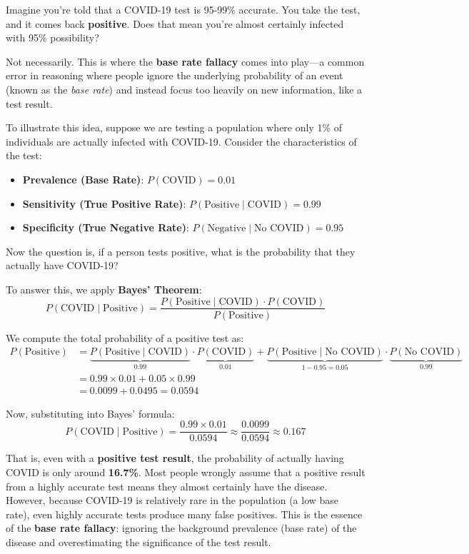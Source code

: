 \documentclass[twoside]{book}
\begin{document}
\medskip

Imagine you're told that a COVID-19 test is 95-99\% accurate. You take the test, and it comes back \textbf{positive}. Does that mean you're almost certainly infected with 95\% possibility?

Not necessarily. This is where the \textbf{base rate fallacy} comes into play—a common error in reasoning where people ignore the underlying probability of an event (known as the \textit{base rate}) and instead focus too heavily on new information, like a test result.

To illustrate this idea, suppose we are testing a population where only 1\% of individuals are actually infected with COVID-19. Consider the characteristics of the test:

\begin{itemize}
    \item \textbf{Prevalence (Base Rate)}: $P(\text{COVID}) = 0.01$
    \item \textbf{Sensitivity (True Positive Rate)}: $P(\text{Positive} \mid \text{COVID}) = 0.99$
    \item \textbf{Specificity (True Negative Rate)}: $P(\text{Negative} \mid \text{No COVID}) = 0.95$
\end{itemize}

Now the question is, if a person tests positive, what is the probability that they actually have COVID-19?


To answer this, we apply \textbf{Bayes’ Theorem}:
\[
P(\text{COVID} \mid \text{Positive}) = \frac{P(\text{Positive} \mid \text{COVID}) \cdot P(\text{COVID})}{P(\text{Positive})}
\]

We compute the total probability of a positive test as:
\begin{align*}
P(\text{Positive}) &= \underbrace{P(\text{Positive} \mid \text{COVID})}_{0.99} \cdot \underbrace{P(\text{COVID})}_{0.01} + \underbrace{P(\text{Positive} \mid \text{No COVID})}_{1-0.95 = 0.05} \cdot \underbrace{P(\text{No COVID})}_{0.99}\\
&= 0.99\times 0.01 + 0.05 \times 0.99 \\
&= 0.0099 + 0.0495 = 0.0594
\end{align*}

Now, substituting into Bayes' formula:
\[
P(\text{COVID} \mid \text{Positive}) = \frac{0.99 \times 0.01}{0.0594} \approx \frac{0.0099}{0.0594} \approx 0.167
\]

That is, even with a \textbf{positive test result}, the probability of actually having COVID is only around \textbf{16.7\%}. Most people wrongly assume that a positive result from a highly accurate test means they almost certainly have the disease. However, because COVID-19 is relatively rare in the population (a low base rate), even highly accurate tests produce many false positives. This is the essence of the \textbf{base rate fallacy}: ignoring the background prevalence (base rate) of the disease and overestimating the significance of the test result.
\end{document}
